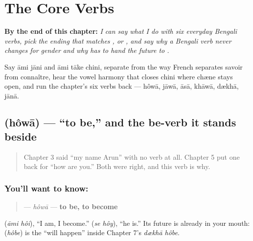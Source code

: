 
\chapter{The Core Verbs}
\label{ch:bn-core-verbs}

\begin{chapteropening}
\textbf{By the end of this chapter:} \emph{I can say what I do with six everyday Bengali verbs, pick the ending that matches ,  or , and say why a Bengali verb never changes for gender and why  has to hand the future to .}

Say āmi jāni and āmi tāke chini, separate  from  the way French separates savoir from connaître, hear the vowel harmony that closes chini where chæne stays open, and run the chapter's six verbs back — hôwā, jāwā, āsā, khāwā, dækhā, jānā.
\end{chapteropening}

\section[hôwā]{ (hôwā) — \textquotedblleft{}to be,\textquotedblright{} and the be-verb it stands beside}

\label{lesson:BN-C07-howa}



\begin{quote}
Chapter 3 said \textquotedblleft{}my name Arun\textquotedblright{} with no verb at all. Chapter 5 put one back for \textquotedblleft{}how are you.\textquotedblright{} Both were right, and this verb is why.
\end{quote}

\subsection*{You'll want to know: }
\begin{quote}
\textbf{} — \emph{hôwā} — \textbf{to be, to become}
\end{quote}

  (\emph{āmi hôi}), \textquotedblleft{}I am, I become.\textquotedblright{}   (\emph{se hôy}), \textquotedblleft{}he is.\textquotedblright{} Its future is already in your mouth: \textbf{} (\emph{hôbe}) is the \textquotedblleft{}will happen\textquotedblright{} inside Chapter 7's \emph{dækhā hôbe}.

